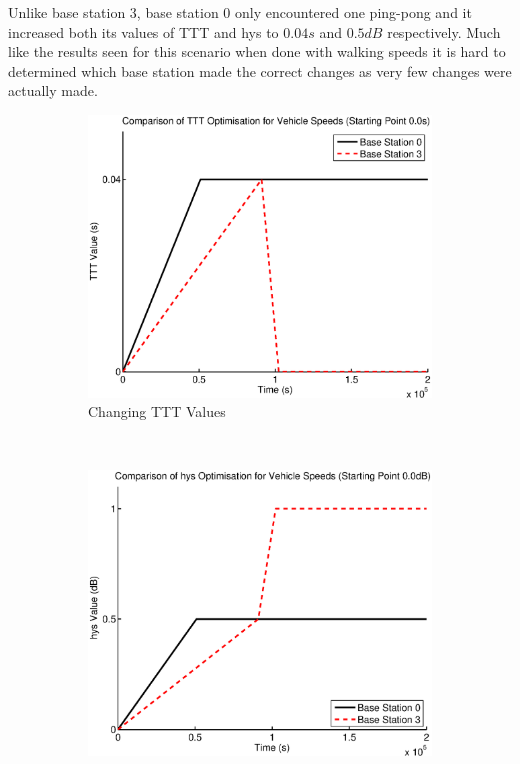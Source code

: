 Unlike base station 3, base station 0 only encountered one ping-pong and it increased both its values of TTT and hys to $0.04 s$ and $0.5 dB$ respectively. Much like the results seen for this scenario when done with walking speeds it is hard to determined which base station made the correct changes as very few changes were actually made.
\begin{figure}[H]
        \centering
        \begin{subfigure}[b]{0.49\textwidth}
                \includegraphics[width=\textwidth]{figures/vehicle_figures/low/long_ttt.eps}
                \caption{Changing TTT Values}
                \label{fig:veh_low_ttt}
        \end{subfigure}%
        ~ %
        \begin{subfigure}[b]{0.49\textwidth}
                \includegraphics[width=\textwidth]{figures/vehicle_figures/low/long_hys.eps}

\end{subfigure}
\end{figure}
